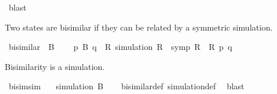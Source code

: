 \begin{isabellebody}
\ blast\isanewline
\ \ \isamarkupfalse%
\isanewline
{}\isamarkupfalse%
%
\endisatagproof
{\isafoldproof}%
%
\isadelimproof
%
\endisadelimproof
%
\begin{isamarkuptext}%
Two states are bisimilar if they can be related by a symmetric simulation.%
\end{isamarkuptext}\isamarkuptrue%
\isamarkupfalse%
\ bisimilar\ {\isacharparenleft}{\kern0pt}\ {\isacartoucheopen}{\isasymsimeq}B{\isacartoucheclose}\ {}{}{\isacharparenright}{\kern0pt}\ \isanewline
\ \ {\isacartoucheopen}p\ {\isasymsimeq}B\ q\ {\isasymequiv}\ {\isasymexists}R{\isachardot}{\kern0pt}\ simulation\ R\ {\isasymand}\ symp\ R\ {\isasymand}\ R\ p\ q{\isacartoucheclose}%
\begin{isamarkuptext}%
Bisimilarity is a simulation.%
\end{isamarkuptext}\isamarkuptrue%
\isamarkupfalse%
\ bisim{\isacharunderscore}{\kern0pt}sim{\isacharcolon}{\kern0pt}\isanewline
\ \ \ {\isacartoucheopen}simulation\ {\isacharparenleft}{\kern0pt}{\isasymsimeq}B{\isacharparenright}{\kern0pt}{\isacartoucheclose}\isanewline
%
\isadelimproof
\ \ %
\endisadelimproof
%
\isatagproof
{}\isamarkupfalse%
\ bisimilar{\isacharunderscore}{\kern0pt}def\ simulation{\isacharunderscore}{\kern0pt}def\ \isamarkupfalse%
\ blast%
\endisatagproof
{\isafoldproof}%
%
\isadelimproof
\isanewline
%
\endisadelimproof
\isanewline
\isanewline
{}\isamarkupfalse%
\isanewline
%
\isadelimtheory
%
\endisadelimtheory
%
\isatagtheory
{}\isamarkupfalse%
%
\endisatagtheory
{\isafoldtheory}%
%
\isadelimtheory
%
\endisadelimtheory
%
\end{isabellebody}%
\endinput
